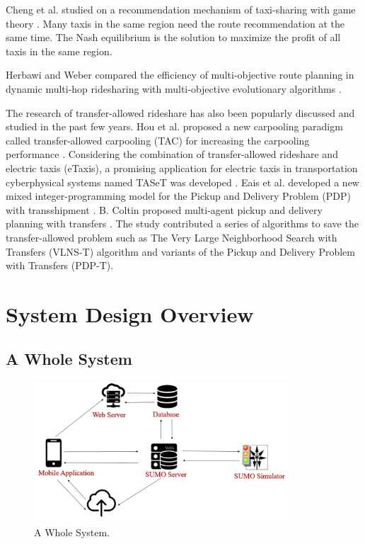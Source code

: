 \documentclass[12pt]{ksthesis}
\begin{document}
\begin{thesis}
{Cheng et al. studied on a recommendation mechanism of taxi-sharing with game theory \cite{GAME}.  Many taxis in the same region need the route recommendation at the same time.
The Nash equilibrium is the solution to maximize the profit of all taxis in the same region. 

Herbawi and Weber compared the efficiency of multi-objective route planning in dynamic multi-hop ridesharing with multi-objective evolutionary algorithms \cite{CMEA}.

The research of transfer-allowed rideshare has also been popularly discussed and studied in the past few years. Hou et al. proposed a new carpooling paradigm called transfer-allowed carpooling (TAC) for increasing the carpooling performance \cite{TICTAC}. Considering the combination of transfer-allowed rideshare and electric taxis (eTaxis), a promising application for electric taxis in transportation cyberphysical systems named TASeT was developed \cite{TASET}. Eais et al. developed a new mixed integer-programming model for the Pickup and Delivery Problem (PDP) with transshipment \cite{NMIPM}. B. Coltin proposed multi-agent pickup and delivery planning with transfers \cite{MAPDPT}. The study contributed a series of algorithms to save the transfer-allowed problem such as The Very Large Neighborhood Search with Transfers (VLNS-T) algorithm and variants of the Pickup and Delivery Problem with Transfers (PDP-T). 




\chapter{System Design Overview}\label{Chap:Architecture}

\section{A Whole System}

\begin{figure}[t!]
\centering
\includegraphics[width=0.85\textwidth]{./Thesis_figures/F3-1_a_whole_system.PNG}
\caption{\large A Whole System.}
\vspace{0.5cm}
\label{Fig:A_Whole_System}
\end{figure}

}
\end{thesis}
\end{document}
